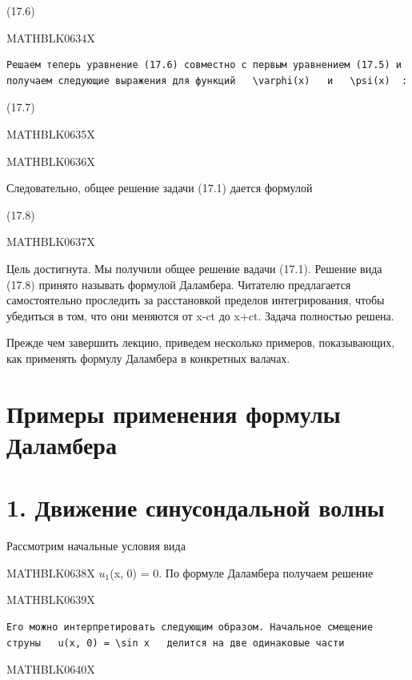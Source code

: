 \documentclass[
]{article}
\begin{document}
(17.6)

MATHBLK0634X

\begin{verbatim}
Решаем теперь уравнение (17.6) совместно с первым уравнением (17.5) и получаем следующие выражения для функций   \varphi(x)   и   \psi(x)  :
\end{verbatim}

(17.7)

MATHBLK0635X

MATHBLK0636X

Следовательно, общее решение задачи (17.1) дается формулой

(17.8)

MATHBLK0637X

Цель достигнута. Мы получили общее решение вадачи (17.1). Решение вида
(17.8) принято называть формулой Даламбера. Читателю предлагается
самостоятельно проследить за расстановкой пределов интегрирования, чтобы
убедиться в том, что они меняются от x-ct до x+ct. Задача полностью
решена.

Прежде чем завершить лекцию, приведем несколько примеров, показывающих,
как применять формулу Даламбера в конкретных валачах.

\section{Примеры применения формулы
Даламбера}\label{ux43fux440ux438ux43cux435ux440ux44b-ux43fux440ux438ux43cux435ux43dux435ux43dux438ux44f-ux444ux43eux440ux43cux443ux43bux44b-ux434ux430ux43bux430ux43cux431ux435ux440ux430}

\section{1. Движение синусондальной
волны}\label{ux434ux432ux438ux436ux435ux43dux438ux435-ux441ux438ux43dux443ux441ux43eux43dux434ux430ux43bux44cux43dux43eux439-ux432ux43eux43bux43dux44b}

Рассмотрим начальные условия вида

MATHBLK0638X \(u_1\)(x, 0) = 0. По формуле Даламбера получаем решение

MATHBLK0639X

\begin{verbatim}
Его можно интерпретировать следующим образом. Начальное смещение струны   u(x, 0) = \sin x   делится на две одинаковые части
\end{verbatim}

MATHBLK0640X
\end{document}
